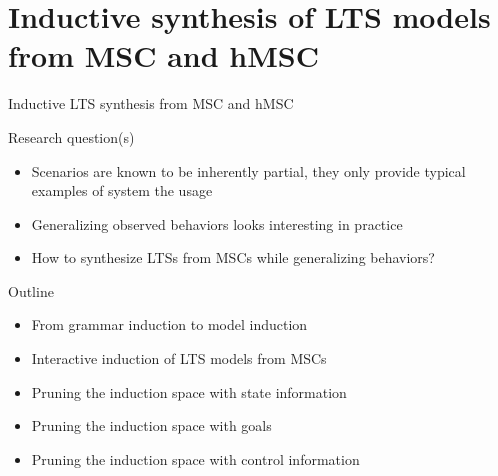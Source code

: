 \section[Inductive Synthesis]{Inductive synthesis of LTS models from MSC and hMSC}


\begin{frame}{Inductive LTS synthesis from MSC and hMSC}

  \begin{block}{Research question(s)}
		\begin{itemize}
			\item Scenarios are known to be inherently partial, they only provide typical 
            examples of system the usage
			\item Generalizing observed behaviors looks interesting in practice
      \item How to synthesize LTSs from MSCs while generalizing behaviors?
		\end{itemize}
	\end{block}

  \begin{block}{Outline}
    \begin{itemize}
      \item From grammar induction to model induction
      \item Interactive induction of LTS models from MSCs
      \item Pruning the induction space with state information
      \item Pruning the induction space with goals
      \item Pruning the induction space with control information
    \end{itemize}
	\end{block}

\end{frame}
 
